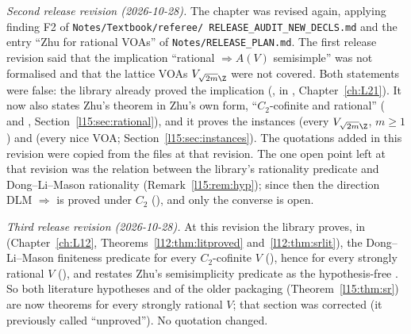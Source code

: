 \emph{Second release revision (2026-10-28).} The chapter was revised again, applying finding F2 of \texttt{Notes/\allowbreak Textbook/\allowbreak referee/\allowbreak
RELEASE\_AUDIT\_NEW\_DECLS.md} and the entry ``Zhu for rational VOAs'' of \texttt{Notes/\allowbreak RELEASE\_PLAN.md}. The
first release revision said that the implication ``rational $\Rightarrow A(V)$ semisimple'' was not formalised and that the
lattice VOAs $V_{\sqrt{2m}\Z}$ were not covered. Both statements were false: the library already proved the implication
(\allowbreak{}\allowbreak{}\allowbreak{}, in , Chapter~\ref{ch:L21}). It now also states Zhu's theorem in Zhu's own form, ``$C_2$-cofinite and
rational'' (\allowbreak{}\allowbreak{}\allowbreak{} and
\allowbreak{}\allowbreak{}, Section~\ref{l15:sec:rational}), and it proves the instances
 (every $V_{\sqrt{2m}\Z}$, $m\ge1$) and  (every nice VOA;
Section~\ref{l15:sec:instances}). The quotations added in this revision were copied from the files at that revision. The
one open point left at that revision was the relation between the library's rationality predicate 
and Dong--Li--Mason rationality (Remark~\ref{l15:rem:hyp}); since then the direction DLM $\Rightarrow$
 is proved under $C_2$ (), and only the converse is open.

\emph{Third release revision (2026-10-28).} At this revision the library proves, in
 (Chapter~\ref{ch:L12},
Theorems~\ref{l12:thm:litproved} and~\ref{l12:thm:srlit}), the Dong--Li--Mason finiteness predicate
 for every $C_2$-cofinite $V$ (), hence
for every strongly rational $V$ (), and restates Zhu's semisimplicity
predicate as the hypothesis-free . So both literature hypotheses  and 
of the older packaging  (Theorem~\ref{l15:thm:sr}) are now theorems for every
strongly rational $V$; that section was corrected (it previously called  ``unproved''). No quotation changed.

